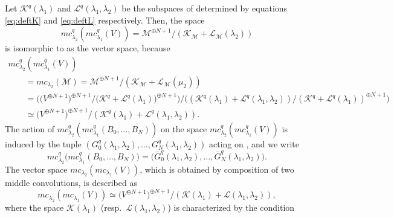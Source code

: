 \documentclass[pdftex]{sigma}
\numberwithin{equation}{section}
\theoremstyle{definition}
\begin{document}
Let $ \mathcal{K}^{q} (\lambda _1) $ and $\mathcal{L} ^{q} ( \lambda _1, \lambda _2 ) $ be the subspaces of  determined by equations \eqref{eq:deftK} and \eqref{eq:deftL} respectively.
Then, the space
\[
mc _{\lambda _2} ^{q} (mc _{\lambda _1} ^{q} (V)) = {\mathcal M }^{\oplus N+1} /({\mathcal K }_{\mathcal M } + {\mathcal L_{\mathcal M }} (\lambda _2 ) )
\]
 is isomorphic to  as the vector space, because
\begin{gather*}
 mc _{\lambda _2} ^{q} (mc _{\lambda _1} ^{q} (V)) \\
 \qquad= mc _{\lambda _2} ({\mathcal M }) = {\mathcal M }^{\oplus N+1} /({\mathcal K }_{\mathcal M } + {\mathcal L_{\mathcal M }} (\mu _2 ) ) \\
 \qquad= \bigl(\bigl(V^{\oplus N+1} \bigr)^{\oplus N+1} \!/ \bigl(\mathcal{K}^{q} + \mathcal{L}^{q} (\lambda _1 )\bigr) ^{\oplus N+1} \bigr) /\bigl(( \mathcal{K}^{q} (\lambda _1) + \mathcal{L} ^{q} ( \lambda _1, \lambda _2 ) )/(\mathcal{K}^{q} + \mathcal{L}^{q} (\lambda _1 )) ^{\oplus N+1} \bigr) \\
 \qquad\simeq \bigl(V^{\oplus N+1}\bigr)^{\oplus N+1} /( \mathcal{K}^{q} (\lambda _1) + \mathcal{L} ^{q} ( \lambda _1, \lambda _2 ) ).
\end{gather*}
The action of $mc ^{q}_{\lambda _2} (mc^{q}_{\lambda _1} (B_0, \dots ,B_N)) $ on the space $mc ^{q}_{\lambda _2} (mc ^{q}_{\lambda _1} (V)) $ is induced by the tuple $(G_0^{q} (\lambda _1, \lambda _2 ), \dots , G_N^{q} (\lambda _1, \lambda _2 ) )$ acting on , and we write
\begin{equation} \label{eq:mcqmcq}
mc ^{q}_{\lambda _2} \bigl(mc^{q}_{\lambda _1} (B_0, \dots ,B_N)\bigr) = \bigl(\overline{G}_0^{q} (\lambda _1, \lambda _2 ), \dots , \overline{G}_N^{q} (\lambda _1, \lambda _2 )\bigr).
\end{equation}
The vector space $mc _{\lambda _2} (mc _{\lambda _1} (V))$, which is obtained by composition of two middle convolutions, is described as
\begin{equation*}
 mc _{\lambda _2} (mc _{\lambda _1} (V)) \simeq \bigl(V^{\oplus N+1}\bigr)^{\oplus N+1} /( \mathcal{K} (\lambda _1) + \mathcal{L} ( \lambda _1, \lambda _2 ) ) ,
\end{equation*}
where the space $\mathcal{K} (\lambda _1)$ (resp.~$\mathcal{L} ( \lambda _1, \lambda _2 )$) is characterized by the condition
\end{document}
